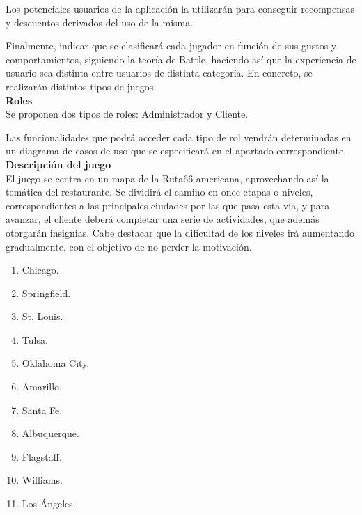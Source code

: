 \documentclass[twoside]{report}
\begin{document}
Los potenciales usuarios de la aplicación la utilizarán para conseguir recompensas y descuentos derivados del uso de la misma.

Finalmente, indicar que se clasificará cada jugador en función de sus gustos y comportamientos, siguiendo la teoría de Battle, haciendo así que la experiencia de usuario sea distinta entre usuarios de distinta categoría. En concreto, se realizarán distintos tipos de juegos.\\

\textbf{Roles}\\

Se proponen dos tipos de roles: Administrador y Cliente.

Las funcionalidades que podrá acceder cada tipo de rol vendrán determinadas en un diagrama de casos de uso que se especificará en el apartado correspondiente. \\

\textbf{Descripción del juego}\\

El juego se centra en un mapa de la Ruta66 americana, aprovechando así la temática del restaurante. Se dividirá el camino en once etapas o niveles, correspondientes a las principales ciudades por las que pasa esta vía, y para avanzar, el cliente deberá completar una serie de actividades, que además otorgarán insignias. Cabe destacar que la dificultad de los niveles irá aumentando gradualmente, con el objetivo de no perder la motivación.

\begin{enumerate}
\item Chicago.
\item Springfield.
\item St. Louis.
\item Tulsa.
\item Oklahoma City.
\item Amarillo.
\item Santa Fe.
\item Albuquerque.
\item Flagstaff.
\item Williams.
\item Los Ángeles.
\end{enumerate}
\end{document}
